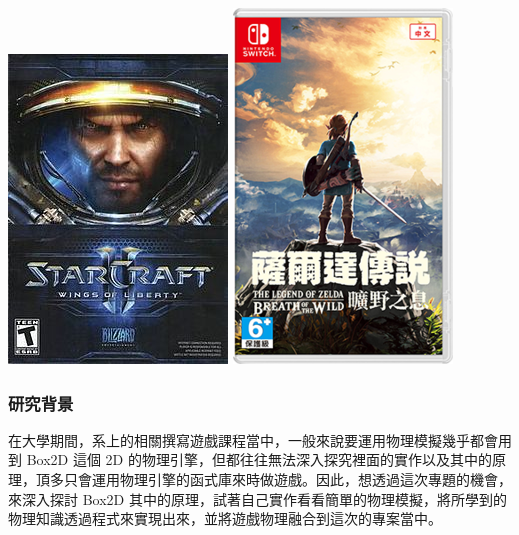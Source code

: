 \begin{itemize}
                \includegraphics[height=0.2\linewidth]{./resources/physics/havok(2).png}
                \includegraphics[height=0.2\linewidth]{./resources/physics/havok(3).png}
\end{itemize}


\subsubsection{研究背景}

在大學期間，系上的相關撰寫遊戲課程當中，一般來說要運用物理模擬幾乎都會用到 Box2D 這個 2D 的物理引擎，但都往往無法深入探究裡面的實作以及其中的原理，頂多只會運用物理引擎的函式庫來時做遊戲。因此，想透過這次專題的機會，來深入探討 Box2D 其中的原理，試著自己實作看看簡單的物理模擬，將所學到的物理知識透過程式來實現出來，並將遊戲物理融合到這次的專案當中。

